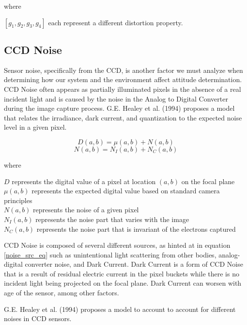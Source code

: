 where 
\begin{center}
    $[g_1, g_2, g_3, g_4]$ each represent a different distortion property.
\end{center}

\subsection*{CCD Noise}
\par \qquad Sensor noise, specifically from the CCD, is another factor we must analyze when determining how our system and the environment affect attitude determination.
CCD Noise often appears as partially illuminated pixels in the absence of a real incident light and is caused by the noise in the Analog to Digital Converter during the image capture process.
G.E. Healey et al. (1994) proposes a model that relates the irradiance, dark current, and quantization to the expected noise level in a given pixel\cite{radiometric_ccd_camera_calibration}.

\begin{equation}
    D(a,b) = \mu(a,b) + N(a,b)
\end{equation}
\begin{equation} \label{noise_src_eq}
    N(a,b) = N_I(a,b) + N_C(a,b)
\end{equation}

where
\begin{center}
    $D$ represents the digital value of a pixel at location $(a,b)$ on the focal plane\\
    $\mu(a,b)$ represents the expected digital value based on standard camera principles\\
    $N(a,b)$ represents the noise of a given pixel\\
    $N_I(a,b)$ represents the noise part that varies with the image\\
    $N_C(a,b)$ represents the noise part that is invariant of the electrons captured
\end{center}

CCD Noise is composed of several different sources, as hinted at in equation \ref{noise_src_eq} such as unintentional light scattering from other bodies, analog-digital converter noise, and Dark Current.
Dark Current is a form of CCD Noise that is a result of residual electric current in the pixel buckets while there is no incident light being projected on the focal plane.
Dark Current can worsen with age of the sensor, among other factors.

\par \qquad G.E. Healey et al. (1994) proposes a model to account to account for different noises in CCD sensors.

